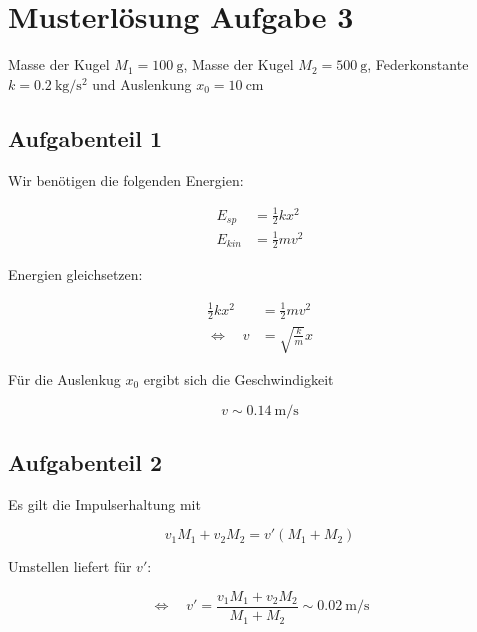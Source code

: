 \section{Musterlösung Aufgabe 3}
Masse der Kugel $M_1=\SI{100}{\gram}$,
Masse der Kugel $M_2=\SI{500}{\gram}$,
Federkonstante $k=\SI{0.2}{\kilo\gram\per\square\second}$ und Auslenkung $x_0=\SI{10}{\centi\meter}$

\subsection{Aufgabenteil 1}
Wir benötigen die folgenden Energien:

\begin{align*}
E_{sp}&=\frac{1}{2}kx^2\\
E_{kin}&=\frac{1}{2}mv^2
\end{align*}

Energien gleichsetzen:

\begin{align*}
\frac{1}{2}kx^2&=\frac{1}{2}mv^2\\
\Leftrightarrow \quad v&=\sqrt{\frac{k}{m}}x
\end{align*}

Für die Auslenkug $x_0$ ergibt sich die Geschwindigkeit

\begin{equation*}
v \sim \SI{0.14}{\meter\per\second}
\end{equation*}

\subsection{Aufgabenteil 2}

Es gilt die Impulserhaltung mit

\begin{equation*}
v_1M_1+v_2M_2=v'\left(M_1+M_2\right)
\end{equation*}

Umstellen liefert für $v'$:

\begin{equation*}
\Leftrightarrow \quad v'=\frac{v_1M_1+v_2M_2}{M_1+M_2} \sim \SI{0.02}{\meter\per\second}
\end{equation*}
